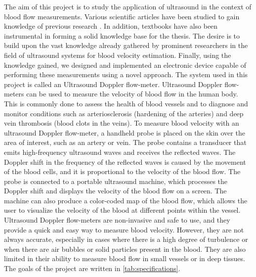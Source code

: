 The aim of this project is to study the application of ultrasound in the context of blood flow measurements. Various scientific articles have been studied to gain knowledge of previous research \cite{Jensen_Analysis_PW_1996,Jansson_Estimation_Perfusion,Huang_Smartphone_2012,JanaSmartphone2020,DingPMUTs,Ding_PW_Pmut,Xu2007_Pulser,Matsuoka_Doppler_Rabbit,Fish_Ultrasonic,Williams2006,Winckler2012,Wang2016,Wang2019,Tsang2009,Govindan2016,Xu2007_Pulser,PICpulser}. In addition, textbooks \cite{JensenUltrasoundBook,ShungUltrasound_Book,Szabo_UltrasoundBook_2} have also been instrumental in forming a solid knowledge base for the thesis. The desire is to build upon the vast knowledge already gathered by prominent researchers in the field of ultrasound systems for blood velocity estimation. Finally, using the knowledge gained, we designed and implemented an electronic device capable of performing these measurements using a novel approach. The system used in this project is called an Ultrasound Doppler flow-meter. Ultrasound Doppler flow-meters can be used to measure the velocity of blood flow in the human body. This is commonly done to assess the health of blood vessels and to diagnose and monitor conditions such as arteriosclerosis (hardening of the arteries) and deep vein thrombosis (blood clots in the veins). To measure blood velocity with an ultrasound Doppler flow-meter, a handheld probe is placed on the skin over the area of interest, such as an artery or vein. The probe contains a transducer that emits high-frequency ultrasound waves and receives the reflected waves. The Doppler shift in the frequency of the reflected waves is caused by the movement of the blood cells, and it is proportional to the velocity of the blood flow. The probe is connected to a portable ultrasound machine, which processes the Doppler shift and displays the velocity of the blood flow on a screen. The machine can also produce a color-coded map of the blood flow, which allows the user to visualize the velocity of the blood at different points within the vessel. Ultrasound Doppler flow-meters are non-invasive and safe to use, and they provide a quick and easy way to measure blood velocity. However, they are not always accurate, especially in cases where there is a high degree of turbulence or when there are air bubbles or solid particles present in the blood. They are also limited in their ability to measure blood flow in small vessels or in deep tissues. The goals of the project are written in \cref{tab:specifications}.

